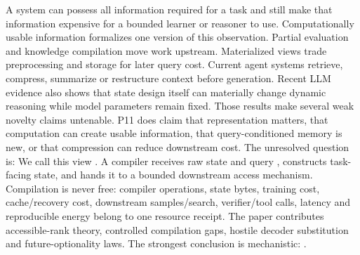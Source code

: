 \markdownRendererDocumentBegin
\markdownRendererSectionBegin
{}\markdownRendererInterblockSeparator
{}A system can possess all information required for a task and still make that information expensive for a bounded learner or reasoner to use. Computationally usable information formalizes one version of this observation. Partial evaluation and knowledge compilation move work upstream. Materialized views trade preprocessing and storage for later query cost. Current agent systems retrieve, compress, summarize or restructure context before generation. Recent LLM evidence also shows that state design itself can materially change dynamic reasoning while model parameters remain fixed.\markdownRendererInterblockSeparator
{}Those results make several weak novelty claims untenable. P11 does  claim that representation matters, that computation can create usable information, that query-conditioned memory is new, or that compression can reduce downstream cost. The unresolved question is:\markdownRendererInterblockSeparator
{}\markdownRendererBlockQuoteBegin
{}
\markdownRendererBlockQuoteEnd \markdownRendererInterblockSeparator
{}We call this view . A compiler  receives raw state  and query , constructs task-facing state, and hands it to a bounded downstream access mechanism. Compilation is never free: compiler operations, state bytes, training cost, cache/recovery cost, downstream samples/search, verifier/tool calls, latency and reproducible energy belong to one resource receipt.\markdownRendererInterblockSeparator
{}The paper contributes accessible-rank theory, controlled compilation gaps, hostile decoder substitution and future-optionality laws. The strongest conclusion is mechanistic: .
\markdownRendererSectionEnd \markdownRendererDocumentEnd